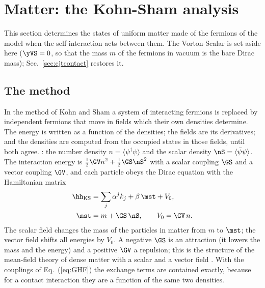 \section{Matter: the Kohn-Sham analysis}
\label{sec:ks}

This section determines the states of uniform matter made of the fermions of the model when the
self-interaction acts between them. The Vorton-Scalar is set aside here ($\yVS=0$, so that the mass
$m$ of the fermions in vacuum is the bare Dirac mass); Sec.~\ref{sec:cjtcontact} restores it.

\subsection{The method}
\label{sec:ksmethod}

In the method of Kohn and Sham \cite{KohnSham1965} a system of interacting fermions is replaced by
independent fermions that move in fields which their own densities determine. The energy is written
as a function of the densities; the fields are its derivatives; and the densities are computed from
the occupied states in those fields, until both agree. : the number density $n=\langle\psi^\dagger\psi\rangle$
and the scalar density $\nS=\langle\bar\psi\psi\rangle$. The interaction energy is
$\tfrac12\GV n^{2}+\tfrac12\GS\nS^{2}$ with a scalar coupling $\GS$ and a vector coupling $\GV$, and
each particle obeys the Dirac equation with the Hamiltonian matrix
\begin{equation}
\begin{aligned}
\hh_{\mathrm{KS}}&=\sum_j\alpha^{j}k_j+\beta\,\mst+V_0,\\
\mst&=m+\GS\,\nS,\qquad V_0=\GV\,n .
\end{aligned}
\label{eq:hKS}
\end{equation}
The scalar field changes the mass of the particles in matter from $m$ to $\mst$; the vector field
shifts all energies by $V_0$. A negative $\GS$ is an attraction (it lowers the mass and the energy)
and a positive $\GV$ a repulsion; this is the structure of the mean-field theory of dense matter
with a scalar and a vector field \cite{Walecka1974}. With the couplings of Eq.~(\ref{eq:GHF}) the exchange terms are
contained exactly, because for a contact interaction they are a function of the same two densities.

